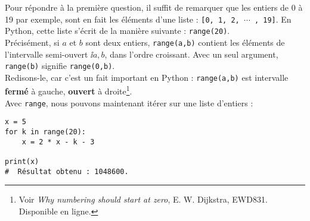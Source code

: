 Pour répondre à la première question, il suffit de remarquer que les entiers de 0 à 19 par exemple, 
sont en fait les éléments d'une liste : \texttt{[0, 1, 2, $\cdots$ , 19]}. En Python, cette liste 
s'écrit de la manière suivante : \texttt{range(20)}.\\
Précisément, si $a$ et $b$ sont deux entiers, \texttt{range(a,b)} contient les éléments de 
l'intervalle semi-ouvert $\ii{a,b}$, dans l'ordre croissant. Avec un seul argument, 
\texttt{range(b)} signifie \texttt{range(0,b)}.\\
Redisons-le, car c'est un fait important en Python : \texttt{range(a,b)} est intervalle 
\textbf{fermé} à gauche, \textbf{ouvert} à
droite\footnote{Voir \textit{Why numbering should start at zero}, E. W. Dijkstra,
  EWD831. Disponible en ligne.}.\\
  
Avec \texttt{range}, nous pouvons maintenant itérer sur une liste d'entiers :

\begin{lstlisting}
x = 5
for k in range(20):
    x = 2 * x - k - 3
  
print(x)
#  Résultat obtenu : 1048600.
\end{lstlisting}

%

%
%
%
%
%
%  


